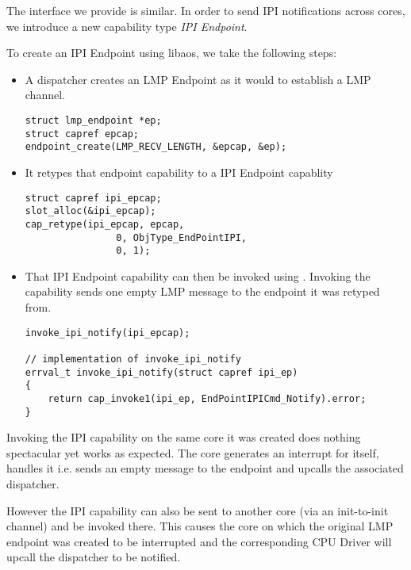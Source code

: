 The interface we provide is similar. In order to send IPI notifications across cores,
we introduce a new capability type \emph{IPI Endpoint}.

To create an IPI Endpoint using libaos, we take the following steps:

\begin{itemize}
    \item A dispatcher creates an LMP Endpoint as it would to establish a LMP channel.

\begin{mdframed}[style=myframe]

\begin{verbatim}
struct lmp_endpoint *ep;
struct capref epcap;
endpoint_create(LMP_RECV_LENGTH, &epcap, &ep); 
\end{verbatim}
\end{mdframed}

    \item It retypes that endpoint capability to a IPI Endpoint capablity
\begin{mdframed}[style=myframe]
\begin{verbatim}
struct capref ipi_epcap;
slot_alloc(&ipi_epcap);
cap_retype(ipi_epcap, epcap,
                0, ObjType_EndPointIPI,
                0, 1);
\end{verbatim}
\end{mdframed}

    \item That IPI Endpoint capability can then be invoked using .
    Invoking the capability sends one empty LMP message to the endpoint it was retyped from.
\begin{mdframed}[style=myframe]
\begin{verbatim}
invoke_ipi_notify(ipi_epcap);

// implementation of invoke_ipi_notify
errval_t invoke_ipi_notify(struct capref ipi_ep)
{
    return cap_invoke1(ipi_ep, EndPointIPICmd_Notify).error;
}
\end{verbatim}
 \end{mdframed}   
\end{itemize}
Invoking the IPI capability on the same core it was created does nothing spectacular
yet works as expected. The core generates an interrupt for itself, handles it i.e. sends
an empty message to the endpoint and upcalls the associated dispatcher.
    
However the IPI capability can also be sent to another core (via an init-to-init channel)
and be invoked there. This causes the core on which the original LMP endpoint
was created to be interrupted and the corresponding CPU Driver will upcall the
dispatcher to be notified.

